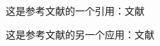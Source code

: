 \documentclass{ctexart} %
\begin{document}
这是参考文献的一个引用：文献\cite{belloni2007doa}

这是参考文献的另一个应用：文献\cite{_doa_2019}


\end{document}

